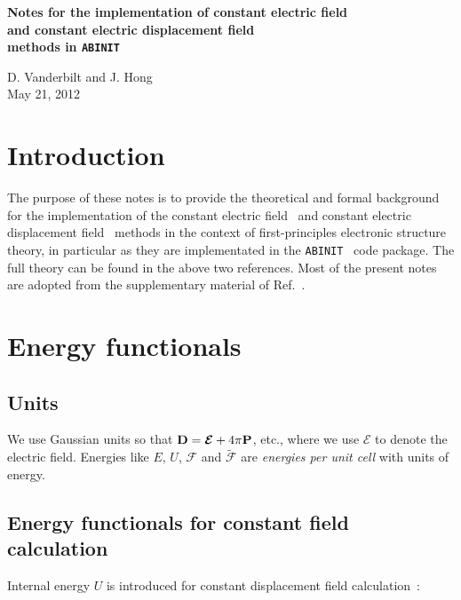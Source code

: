\documentclass[11pt,fleqn]{article}
\def\P{{\bf P}}
\def\E{\mathcal{E}}
\def\EE{\bm{\E}}
\def\D{{\bf D}}
\def\F{\mathcal{F}}
\def\Ft{{\widetilde{\F}}}
\def\ABINIT{{{\tt ABINIT}}}
\begin{document}
\begin{center}

{\large\bf
Notes for the implementation of constant electric field\\
and constant electric displacement field\\
methods in \ABINIT }
\par\bigskip
D. Vanderbilt and J. Hong\\
May 21, 2012

\end{center}


\vskip 0.4cm


\section{Introduction}

The purpose of these notes is to provide the theoretical
and formal background for the implementation of the constant
electric field~\cite{siv} and constant electric displacement
field~\cite{ssv} methods in the context of first-principles
electronic structure theory, in particular as they are
implementated in the \ABINIT~\cite{abinit} code package. The
full theory can be found in the above two references. Most of
the present notes are adopted from the supplementary material
of Ref.~\cite{ssv}.

\section{Energy functionals}

\subsection{Units}

We use Gaussian units so that $\D=\EE+4\pi\P$, etc., where we use
$\EE$ to denote the electric field. Energies like
$E$, $U$, $\F$ and $\Ft$ are {\em energies per unit cell} with
units of energy. 

\subsection{Energy functionals for constant field calculation}
Internal energy $U$ is introduced for constant displacement field
calculation~\cite{ssv}:
\end{document}
